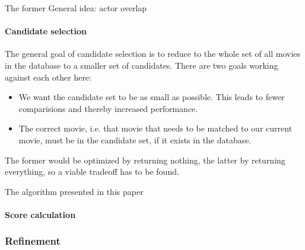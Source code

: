 The former 
General idea: actor overlap

\paragraph{Candidate selection}

The general goal of candidate selection is to reduce to the whole set of all movies in the database to a smaller set of candidates.
There are two goals working against each other here:
\begin{itemize}
	\item We want the candidate set to be as small as possible. This leads to fewer comparisions and thereby increased performance.
	\item The correct movie, i.e. that movie that needs to be matched to our current movie, must be in the candidate set, if it exists in the database.
\end{itemize}
The former would be optimized by returning nothing, the latter by returning everything, so a viable tradeoff has to be found.

The algorithm presented in this paper 
\paragraph{Score calculation}

\subsubsection{Refinement}